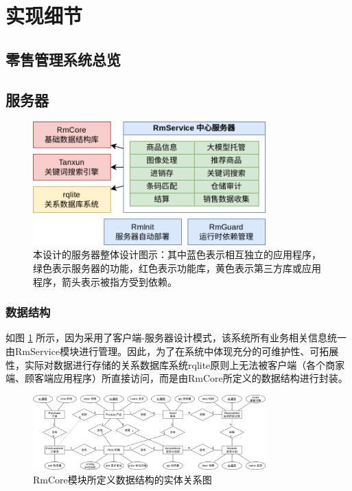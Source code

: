 \newpage
\section{实现细节}

\subsection{零售管理系统总览}
\label{sec:foundation}

\subsection{服务器}

\begin{figure}[htbp]
	\centering
	\includegraphics[width=0.8\textwidth]{./imgs/arch-server.png}
	\caption{本设计的服务器整体设计图示：其中蓝色表示相互独立的应用程序，绿色表示服务器的功能，红色表示功能库，黄色表示第三方库或应用程序，箭头表示被指方受到依赖。}
	\label{fig:arch-server}
\end{figure}

\subsubsection{数据结构}
如图 \ref{fig:arch-server} 所示，因为采用了客户端-服务器设计模式，该系统所有业务相关信息统一由RmService模块进行管理。因此，为了在系统中体现充分的可维护性、可拓展性，实际对数据进行存储的关系数据库系统rqlite原则上无法被客户端（各个商家端、顾客端应用程序）所直接访问，而是由RmCore所定义的数据结构进行封装。

\begin{figure}[htbp]
	\centering
	\includegraphics[width=0.8\textwidth]{./imgs/rms-er-rmcore.png}
	\caption{RmCore模块所定义数据结构的实体关系图}
	\label{fig:rms-er-rmcore}
\end{figure}

